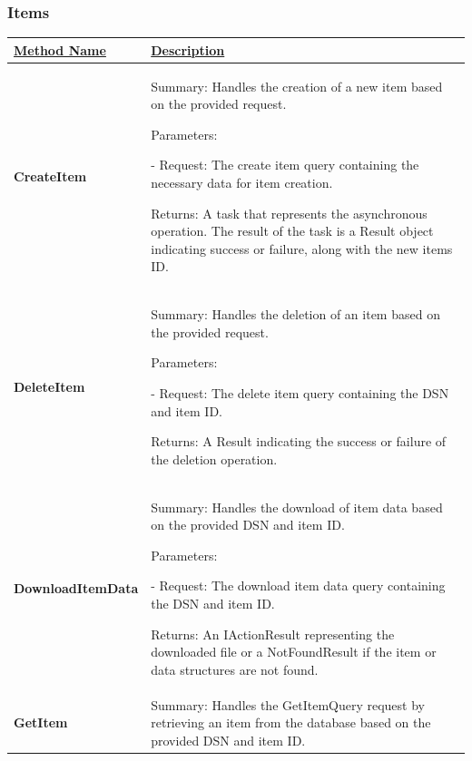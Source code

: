 \subsubsection{Items}
\begin{longtable}
    \centering
    \renewcommand{\arraystretch}{1.2}
    \begin{tabular}{|p{0.25\linewidth}|p{0.75\linewidth}|}
\hline
    \underline{Method Name} & \underline{Description} 
\\
\hline
    \textbf{CreateItem} & Summary: Handles the creation of a new item based on the provided request.
    
Parameters:

- Request: The create item query containing the necessary data for item creation.

Returns: A task that represents the asynchronous operation. The result of the task is a Result object indicating success or failure, along with the new items ID.
\\
\hline
    \textbf{DeleteItem} & Summary: Handles the deletion of an item based on the provided request.
    
Parameters:

- Request: The delete item query containing the DSN and item ID.

Returns: A Result indicating the success or failure of the deletion operation.
\\
\hline
    \textbf{DownloadItemData} & Summary: Handles the download of item data based on the provided DSN and item ID.
    
Parameters:

- Request: The download item data query containing the DSN and item ID.

Returns: An IActionResult representing the downloaded file or a NotFoundResult if the item or data structures are not found.
\\
\hline
    \textbf{GetItem} & Summary: Handles the GetItemQuery request by retrieving an item from the database based on the provided DSN and item ID.
    

\end{tabular}
\end{longtable}
